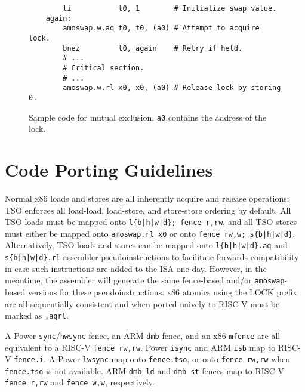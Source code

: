 \begin{figure}[h!]
\begin{center}
\begin{verbatim}
        li           t0, 1        # Initialize swap value.
    again:
        amoswap.w.aq t0, t0, (a0) # Attempt to acquire lock.
        bnez         t0, again    # Retry if held.
        # ...
        # Critical section.
        # ...
        amoswap.w.rl x0, x0, (a0) # Release lock by storing 0.
\end{verbatim}
\end{center}
\caption{Sample code for mutual exclusion.  {\tt a0} contains the address of the lock.}
\label{critical}
\end{figure}

\section{Code Porting Guidelines}
\label{sec:porting}

Normal x86 loads and stores are all inherently acquire and release operations: TSO enforces all load-load, load-store, and store-store ordering by default.
All TSO loads must be mapped onto {\tt l\{b|h|w|d\}; fence r,rw}, and all TSO stores must either be mapped onto {\tt amoswap.rl x0} or onto {\tt fence rw,w; s\{b|h|w|d\}}.
Alternatively, TSO loads and stores can be mapped onto {\tt l\{b|h|w|d\}.aq} and {\tt s\{b|h|w|d\}.rl} assembler pseudoinstructions to facilitate forwards compatibility in case such instructions are added to the ISA one day.
However, in the meantime, the assembler will generate the same fence-based and/or {\tt amoswap}-based versions for these pseudoinstructions.
x86 atomics using the LOCK prefix are all sequentially consistent and when ported naively to RISC-V must be marked as {\tt .aqrl}.

A Power {\tt sync}/{\tt hwsync} fence, an ARM {\tt dmb} fence, and an x86 {\tt mfence} are all equivalent to a RISC-V {\tt fence rw,rw}.
Power {\tt isync} and ARM {\tt isb} map to RISC-V {\tt fence.i}.
A Power {\tt lwsync} map onto {\tt fence.tso}, or onto {\tt fence rw,rw} when {\tt fence.tso} is not available.
ARM {\tt dmb ld} and {\tt dmb st} fences map to RISC-V {\tt fence r,rw} and {\tt fence w,w}, respectively.

